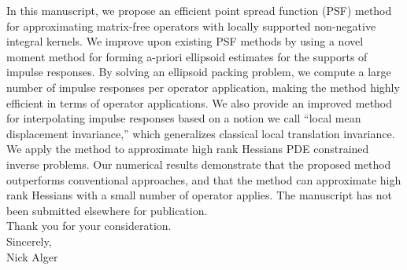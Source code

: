\documentclass[11pt]{article}
\begin{document}
In this manuscript, we propose an efficient point spread function (PSF) method for approximating matrix-free operators with locally supported non-negative integral kernels. We improve upon existing PSF methods by using a novel moment method for forming a-priori ellipsoid estimates for the supports of impulse responses. By solving an ellipsoid packing problem, we compute a large number of impulse responses per operator application, making the method highly efficient in terms of operator applications. We also provide an improved method for interpolating impulse responses based on a notion we call ``local mean displacement invariance,'' which generalizes classical local translation invariance. We apply the method to approximate high rank Hessians PDE constrained inverse problems. Our numerical results demonstrate that the proposed method outperforms conventional approaches, and that the method can approximate high rank Hessians with a small number of operator applies. The manuscript has not been submitted elsewhere for
publication.\\[1ex]


\noindent Thank you for your consideration.\\[3ex]


\noindent Sincerely,\\[5ex]
\phantom{dd}\hspace{2cm} Nick Alger
\end{document}
